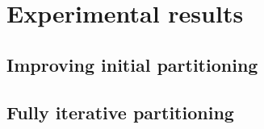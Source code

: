\chapter{Experimental results} \label{chap:experimental_results}
\section{Improving initial partitioning}
\section{Fully iterative partitioning}



